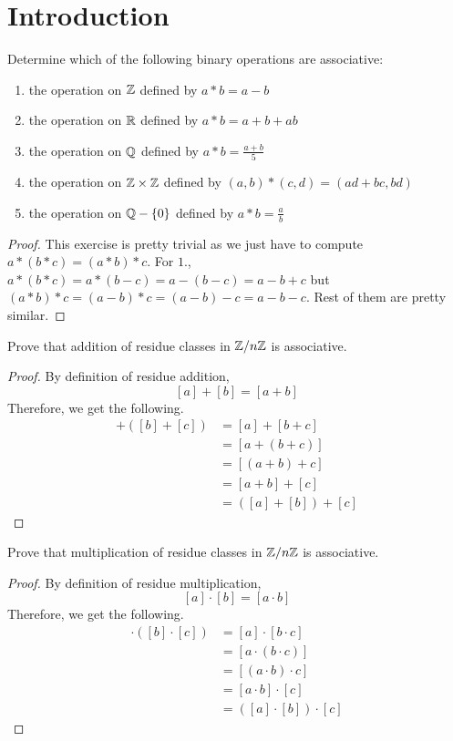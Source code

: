 \section{Introduction}

\begin{problem}
    Determine which of the following binary operations are associative:
    \begin{enumerate}
        \item the operation on $\mathbb{Z}$ defined by $a*b = a - b$
        \item the operation on $\mathbb{R}$ defined by $a*b = a + b + ab$
        \item the operation on $\mathbb{Q}$ defined by $a*b = \frac{a+b}{5}$
        \item the operation on $\mathbb{Z} \times \mathbb{Z}$ defined by $(a,b)*(c,d) = (ad+bc, bd)$
        \item the operation on $\mathbb{Q}-\{0\}$ defined by $a*b = \frac{a}{b}$
    \end{enumerate}
\end{problem}

\begin{proof}
    This exercise is pretty trivial as we just have to compute $a*(b*c)=(a*b)*c$.
    For $1.$, $a*(b*c)=a*(b-c)=a-(b-c)=a-b+c$ but $(a*b)*c=(a-b)*c=(a-b)-c=a-b-c$.
    Rest of them are pretty similar.
\end{proof}

\begin{problem}
    Prove that addition of residue classes in $\mathbb{Z}/n\mathbb{Z}$ is associative.
\end{problem}

\begin{proof}
    By definition of residue addition,
    \[ [a]+[b]= [a+b] \]
    Therefore, we get the following.
    \begin{align*}
        [a]+([b]+[c])&=[a]+[b+c]\\
        &= [a+(b+c)] \\
        &= [(a+b)+c] \\
        &= [a+b]+[c] \\
        &= ([a]+[b])+[c]
    \end{align*}
\end{proof}

\begin{problem}
    Prove that multiplication of residue classes in $\mathbb{Z}/n\mathbb{Z}$ is associative.
\end{problem}

\begin{proof}
     By definition of residue multiplication,
    \[ [a]\cdot[b]= [a \cdot b] \]
    Therefore, we get the following.
    \begin{align*}
        [a]\cdot ([b] \cdot [c]) &= [a]\cdot [b \cdot c] \\
        &= [a \cdot (b \cdot c) ] \\
        &= [(a \cdot b) \cdot c] \\
        &= [a \cdot b] \cdot [c] \\
        &= ([a] \cdot [b]) \cdot [c]
    \end{align*}
\end{proof}

